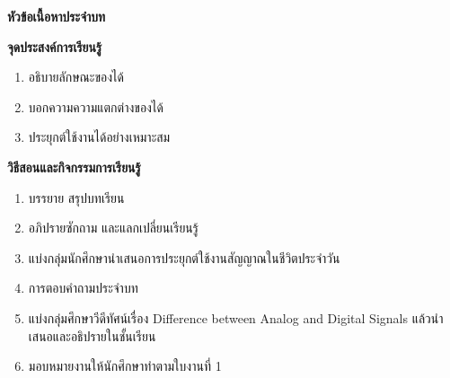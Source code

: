 \introChapter{}
\vspace*{0.5cm}
\noindent
\textbf{\large หัวข้อเนื้อหาประจำบท}
\begin{description}[topsep=0.5cm,itemsep=-1ex,labelindent=1.5cm]
\item {}
\item {}
\item {}
\end{description}
\vspace*{0.5cm}
\noindent
\textbf{\large จุดประสงค์การเรียนรู้}\\[0.5cm]
\subtitle{หลังจากเรียนบทนี้จบแลว ผูเรียนควรมีความสามารถดังตอไปนี้}
\begin{enumerate}[itemsep=-1ex]
	\item อธิบายลักษณะของได้
	\item บอกความความแตกต่างของได้
	\item ประยุกต์ใช้งานได้อย่างเหมาะสม
\end{enumerate}
\vspace{0.5cm}
\noindent
\textbf{\large วิธีสอนและกิจกรรมการเรียนรู้}
\begin{enumerate}[topsep=0.5cm,itemsep=-1ex]
 \item บรรยาย สรุปบทเรียน
 \item อภิปรายซักถาม และแลกเปลี่ยนเรียนรู้
 \item แบ่งกลุ่มนักศึกษานำเสนอการประยุกต์ใช้งานสัญญาณในชีวิตประจำวัน
 \item การตอบคำถามประจำบท
 \item แบ่งกลุ่มศึกษาวีดีทัศน์เรื่อง Difference between Analog and Digital Signals  แล้วนำเสนอและอธิปรายในชั้นเรียน
 \item มอบหมายงานให้นักศึกษาทำตามใบงานที่ 1
\end{enumerate}



